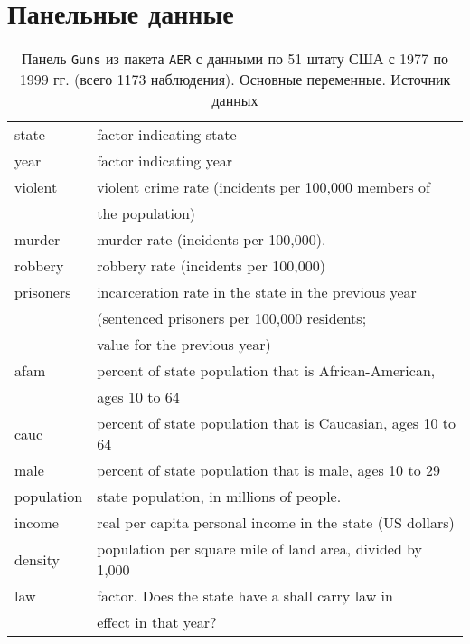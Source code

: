 \documentclass[12pt]{article}
\theoremstyle{remark}
\begin{document}
\newpage

\section{Панельные данные}

\begin{table}
	\caption{Панель \texttt{Guns}
	из пакета \texttt{AER} с данными по 51 штату США с 1977 по 1999 гг.
	(всего 1173 наблюдения).  Основные переменные.
	Источник данных \cite{Guns}}
	\label{Guns}
	\begin{tabular}{l|l}\hline
	state &  factor indicating state \\
	year  &  factor indicating year \\
	violent & violent crime rate (incidents per 100,000 members of \\
	& the population) \\
	murder & murder rate (incidents per 100,000). \\
	robbery&  robbery rate (incidents per 100,000) \\
	prisoners & incarceration rate in the state in the previous year \\
	&  (sentenced prisoners per 100,000 residents;\\
	& value for the previous year) \\
	afam & percent of state population that is African-American, \\
	& ages 10 to 64 \\
	cauc  & percent of state population that is Caucasian, ages 10 to 64 \\
	male & percent of state population that is male, ages 10 to 29 \\
	population & state population, in millions of people. \\
	income & real per capita personal income in the state (US dollars) \\
	density & population per square mile of land area, divided by 1,000 \\
	law & factor. Does the state have a shall carry law in \\
	& effect in that year?\\
	\hline
	\end{tabular}
\end{table}
\end{document}
